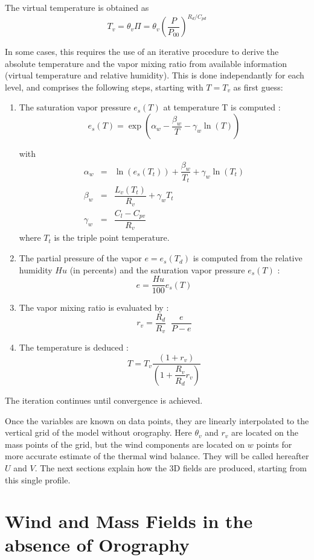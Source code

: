 The virtual temperature is obtained as
\begin{equation}
T_{v} = \theta_{v} \Pi = \theta_{v} \left( \dfrac{P}{P_{00}} \right) ^{R_{d}/C_{pd}}
\end{equation}



In some cases, this requires the use of an iterative procedure
to derive the absolute temperature and the vapor mixing ratio from
available information (virtual temperature and relative humidity).
This is done independantly for each level, and
comprises the following steps, starting with $T=T_v$ as first guess:
\begin{enumerate}
\item The saturation vapor pressure $e_{s}(T)$ at temperature T is computed  :
$$
e_{s}(T) =  \exp\left( \alpha_{w} - \dfrac{\beta_{w}}{T} - \gamma_{w}
\ln (T)\right)
$$

with
\begin{eqnarray*}
\alpha_{w} & = &  \ln (e_{s}(T_{t}) ) + \dfrac{\beta_{w}}{T_{t}} + \gamma_{w}
\ln (T_{t}) \\
\beta_{w} & = & \dfrac{L_{v}(T_{t})}{R_{v}} + \gamma_{w} T_{t} \\
\gamma_{w} & = & \dfrac{C_{l}-C_{pv}}{R_{v}}
\end{eqnarray*}
where $T_t$ is the triple point temperature.

\item  The partial pressure of the vapor $e= e_{s}(T_d)$
is computed from the relative humidity $Hu$ (in percents) and the saturation
vapor pressure $e_{s}(T)$ :
$$
e= \dfrac{Hu}{100} e_{s}(T)
$$
\item  The vapor mixing ratio is evaluated by :
$$
r_{v} = \dfrac{R_{d}}{R_{v}} \;\; \dfrac{e}{P-e}
$$
\item   The temperature is deduced :
$$
T = T_{v} \dfrac{(1+r_{v})}{(1 + \dfrac{R_{v}}{R_{d}}r_{v})}
$$
\end{enumerate}
The iteration continues until convergence is achieved.

Once the variables are known on data points, they are linearly
interpolated to the vertical grid of the model without orography.
Here $\theta_v$ and $r_v$ are located on the mass points of the grid,
but the wind components are located on $w$ points for more accurate
estimate of the thermal wind balance. They will be called hereafter
$U$ and $V$.  The
next sections explain how the 3D fields are produced, starting from this
single profile.

\section{Wind and Mass Fields in the absence of Orography}

